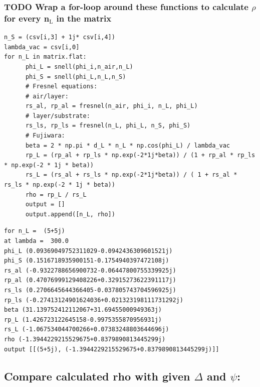 \documentclass[11pt]{article}
\begin{document}
\subsubsection{{\bfseries\sffamily TODO} Wrap a for-loop around these functions to calculate \(\rho\) for every n\(_{\text{L}}\) in the matrix}
\label{sec:orgf88de90}
\begin{verbatim}
n_S = (csv[i,3] + 1j* csv[i,4])
lambda_vac = csv[i,0]
for n_L in matrix.flat:
      phi_L = snell(phi_i,n_air,n_L)
      phi_S = snell(phi_L,n_L,n_S)
      # Fresnel equations:
      # air/layer:
      rs_al, rp_al = fresnel(n_air, phi_i, n_L, phi_L)
      # layer/substrate:
      rs_ls, rp_ls = fresnel(n_L, phi_L, n_S, phi_S)
      # Fujiwara:
      beta = 2 * np.pi * d_L * n_L * np.cos(phi_L) / lambda_vac
      rp_L = (rp_al + rp_ls * np.exp(-2*1j*beta)) / (1 + rp_al * rp_ls * np.exp(-2 * 1j * beta)) 
      rs_L = (rs_al + rs_ls * np.exp(-2*1j*beta)) / ( 1 + rs_al * rs_ls * np.exp(-2 * 1j * beta))   
      rho = rp_L / rs_L
      output = []
      output.append([n_L, rho])
\end{verbatim}


\begin{verbatim}
for n_L =  (5+5j)
at lambda =  300.0
phi_L (0.09369049752311029-0.0942436309601521j)
phi_S (0.1516718935900151-0.1754940397472108j)
rs_al (-0.9322788656900732-0.06447800755339925j)
rp_al (0.47076999129408226+0.32915273622391117j)
rs_ls (0.2706645644366405-0.037805743704596925j)
rp_ls (-0.27413124901624036+0.021323198111731292j)
beta (31.139752412112067+31.69455000949363j)
rp_L (1.426723122645158-0.9975355870956931j)
rs_L (-1.067534044700266+0.07383248803644696j)
rho (-1.3944229215529675+0.8379890813445299j)
output [[(5+5j), (-1.3944229215529675+0.8379890813445299j)]]
\end{verbatim}

\subsection{Compare calculated rho with given \(\Delta\) and \(\psi\):}
\label{sec:orgf0e8c09}




\end{document}

